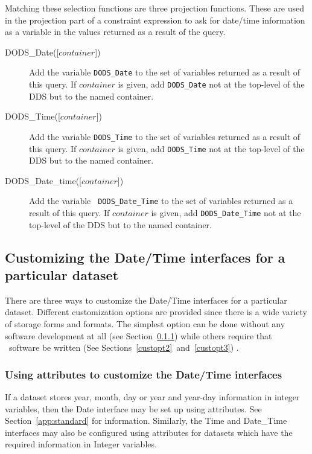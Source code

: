 \documentclass[12pt]{article}
\begin{document}
Matching these selection functions are three projection functions. These are
used in the projection part of a constraint expression to ask for date/time
information as a variable in the values returned as a result of the
query.

\begin{description}
  
\item [DODS\_Date({[}$container${]})] Add the variable {\tt DODS\_Date} to
  the set of variables returned as a result of this query.  If $container$ is
  given, add {\tt DODS\_Date} not at the top-level of the DDS but to the
  named container.
  
\item [DODS\_Time({[}$container${]})] Add the variable {\tt DODS\_Time} to
  the set of variables returned as a result of this query. If $container$ is
  given, add {\tt DODS\_Time} not at the top-level of the DDS but to the
  named container.
  
\item [DODS\_Date\_time({[}$container${]})] Add the variable {\tt
    DODS\_Date\_Time} to the set of variables returned as a result of this
  query. If $container$ is given, add {\tt DODS\_Date\_Time} not at the
  top-level of the DDS but to the named container.

\end{description}

\subsection{Customizing the Date/Time interfaces for a particular dataset}

There are three ways to customize the Date/Time interfaces for a particular
dataset. Different customization options are provided since there is a wide
variety of storage forms and formats. The simplest option can be done without
any software development at all (see Section~\ref{custopt1}) while others
require that \Cpp\ software be written (See
Sections~\ref{custopt2}~and~\ref{custopt3}) .

\subsubsection{Using attributes to customize the Date/Time interfaces}
\label{custopt1}

If a dataset stores year, month, day or year and year-day information in
integer variables, then the Date interface may be set up using attributes.
See Section~\ref{app:standard} for information. Similarly, the Time and
Date\_Time interfaces may also be configured using attributes for datasets
which have the required information in Integer variables.
\end{document}
